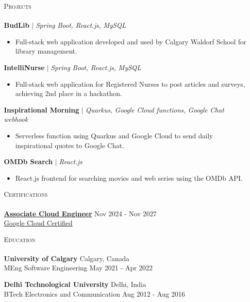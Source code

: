 \documentclass[a4paper]{article}
\newcommand{\lineunder} {
    \vspace*{-8pt} \\
    \hspace*{-18pt} \hrulefill \hspace*{-6pt} \\
}
\newcommand{\header} [1] {
    \vspace*{5pt}
    {\hspace*{-18pt}\vspace*{6pt} \large\textsc{#1}}
    \vspace*{-6pt} \lineunder
}
\newcommand{\resumeHeadingProject}[3]{
    \vspace{1mm}
    {\textbf{#1}} $|$ \emph{#2} %
    \vspace{-2mm}
}
\newcommand{\resumeItemProject}[1]{
  \item{
    \begin{justify}
    \setlength{\rightskip}{0.15in} {#1 \vspace{-4pt}}
    \end{justify}
  }
}
\newcommand{\resumeHeadingEducation}[4]{
    \textbf{#1} \hfill {#2}\\
    {#3} \hfill {#4}\\
    \vspace{2mm}
}
\begin{document}
\header{Projects}

\resumeHeadingProject {BudLib} {Spring Boot, React.js, MySQL} {Jan 2022 - Apr 2022}
\begin{itemize}
    \resumeItemProject {Full-stack web application developed and used by Calgary Waldorf School for library management.}
\end{itemize}

\resumeHeadingProject {IntelliNurse} {Spring Boot, React.js, MySQL} {Feb 2022 - Mar 2022}
\begin{itemize}
    \resumeItemProject {Full-stack web application for Registered Nurses to post articles and surveys, achieving 2nd place in a hackathon.}
\end{itemize}

\resumeHeadingProject {Inspirational Morning} {Quarkus, Google Cloud functions, Google Chat webhook} {Jun 2024 - Jun 2024}
\begin{itemize}
    \resumeItemProject {Serverless function using Quarkus and Google Cloud to send daily inspirational quotes to Google Chat.}
\end{itemize}

\resumeHeadingProject {OMDb Search} {React.js} {Jun 2022 - Jun 2022}
\begin{itemize}
    \resumeItemProject {React.js frontend for searching movies and web series using the OMDb API.}
\end{itemize}


\header{Certifications}
\href{https://www.credly.com/badges/52bb681c-f535-47e7-b669-78e9b4d7c4a0}{\textbf{Associate Cloud Engineer}} \hfill Nov 2024 - Nov 2027\\
\href{https://www.credly.com/badges/52bb681c-f535-47e7-b669-78e9b4d7c4a0}{Google Cloud Certified}
\vspace{2mm}


\header{Education}

\resumeHeadingEducation {University of Calgary} {Calgary, Canada} {MEng Software Engineering} {May 2021 - Apr 2022}
\resumeHeadingEducation {Delhi Technological University} {Delhi, India} {BTech Electronics and Communication} {Aug 2012 - Aug 2016}


\
\end{document}

